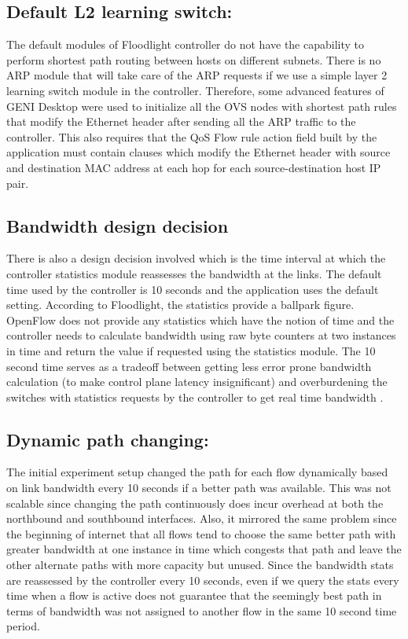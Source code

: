 \documentclass[paper=a4, fontsize=12pt]{scrartcl}	%
\numberwithin{equation}{section}		%
\numberwithin{figure}{section}			%
\numberwithin{table}{section}				%
\begin{document}
\subsection{Default L2 learning switch:}
The default modules of Floodlight controller do not have the capability to perform shortest path routing between hosts on different subnets. There is no ARP module that will take care of the ARP requests if we use a simple layer 2 learning switch module in the controller. Therefore, some advanced features of GENI Desktop were used to initialize all the OVS nodes with shortest path rules that modify the Ethernet header after sending all the ARP traffic to the controller. This also requires that the QoS Flow rule action field built by the application must contain clauses which modify the Ethernet header with source and destination MAC address at each hop for each source-destination host IP pair.
\subsection{Bandwidth design decision}
There is also a design decision involved which is the time interval at which the controller statistics module reassesses the bandwidth at the links. The default time used by the controller is 10 seconds and the application uses the default setting. According to Floodlight, the statistics provide a ballpark figure. OpenFlow does not provide any statistics which have the notion of time and the controller needs to calculate bandwidth using raw byte counters at two instances in time and return the value if requested using the statistics module. The 10 second time serves as a tradeoff between getting less error prone bandwidth calculation (to make control plane latency insignificant) and overburdening the switches with statistics requests by the controller to get real time bandwidth \cite{stats}.
\subsection{Dynamic path changing:}
The initial experiment setup changed the path for each flow dynamically based on link bandwidth every 10 seconds if a better path was available. This was not scalable since changing the path continuously does incur overhead at both the northbound and southbound interfaces. Also, it mirrored the same problem since the beginning of internet that all flows tend to choose the same better path with greater bandwidth at one instance in time which congests that path and leave the other alternate paths with more capacity but unused. Since the bandwidth stats are reassessed by the controller every 10 seconds, even if we query the stats every time when a flow is active does not guarantee that the seemingly best path in terms of bandwidth was not assigned to another flow in the same 10 second time period.
\end{document}
